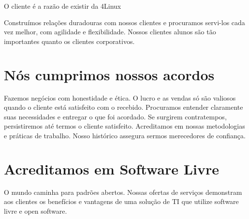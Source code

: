 O cliente é a razão de existir da 4Linux

Construímos relações duradouras com nossos clientes e procuramos servi-los cada vez melhor, com agilidade e flexibilidade. Nossos clientes alunos são tão importantes quanto os clientes corporativos. 

\section{Nós cumprimos nossos acordos }

Fazemos negócios com honestidade e ética. O lucro e as vendas só são valiosos quando o cliente está satisfeito com o recebido. Procuramos entender claramente suas necessidades e entregar o que foi acordado. Se surgirem contratempos, persistiremos até termos o cliente satisfeito. Acreditamos em nossas metodologias e práticas de trabalho. Nosso histórico assegura sermos merecedores de confiança. 

\section{Acreditamos em Software Livre }

O mundo caminha para padrões abertos. Nossas ofertas de serviços demonstram aos clientes os benefícios e vantagens de uma solução de TI que utilize software livre e open software.
